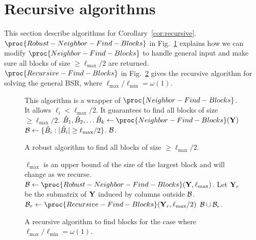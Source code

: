 \section{Recursive algorithms}\label{asec:recursive}
This section describe algorithms for Corollary~\ref{cor:recursive}. $\proc{Robust-Neighbor-Find-Blocks}$ in Fig.~\ref{fig:robustneighbor_algo} explains how we can modify $\proc{Neighbor-Find-Blocks}$ to handle general input and make sure all blocks of size $\geq \ell_{\max}/2$ are returned. $\proc{Recursive-Find-Blocks}$ in Fig.~\ref{fig:recursiveneighbor_algo} gives the recursive algorithm for solving the general BSR, where $\ell_{\max}/\ell_{\min} = \omega(1)$. 

\begin{figure}
{\small
    \centering
    \begin{codebox}
\li \Comment This algorithm is a wrapper of $\proc{Neighbor-Find-Blocks}$. 
\li \Comment It allows $\ell_i < \ell_{\max}/2$. \li \Comment It guarantees to find all blocks of size $\geq \ell_{\max}/2$.
\li $\hat B_1, \hat B_2, \dots \hat B_k \gets \proc{Neighbor-Find-Blocks}(\mY)$
\li  $\mathcal{B} \gets \{\hat B_i: |\hat B_i| \geq \ell_{\max}/2\}$.
\li \Return $\mathcal{B}$. 
\end{codebox}
}
\caption{A robust algorithm to find all blocks of size $\geq \ell_{\max}/2$.}
    \label{fig:robustneighbor_algo}
\end{figure}


\begin{figure}
{\small
    \centering
    \begin{codebox}
\li \Comment $\ell_{\max}$ is an upper bound of the size of the largest block and will change as we recurse. 
\li $\calb \gets \proc{Robust-Neighbor-Find-Blocks}(\mY, \ell_{\max})$.
\li Let $\mathbf{Y}_r$ be the submatrix of $\mathbf{Y}$ induced by columns outside $\mathcal{B}$. 
\li $\calb_r \gets \proc{Recursive-Find-Blocks}(\mY_r, \ell_{\max}/2)$
\li \Return $\mathcal{B} \cup \mathcal{B}_r$.
\end{codebox}
}
\caption{A recursive algorithm to find blocks for the case where $\ell_{\max}/\ell_{\min} = \omega(1)$.}
    \label{fig:recursiveneighbor_algo}
\end{figure}